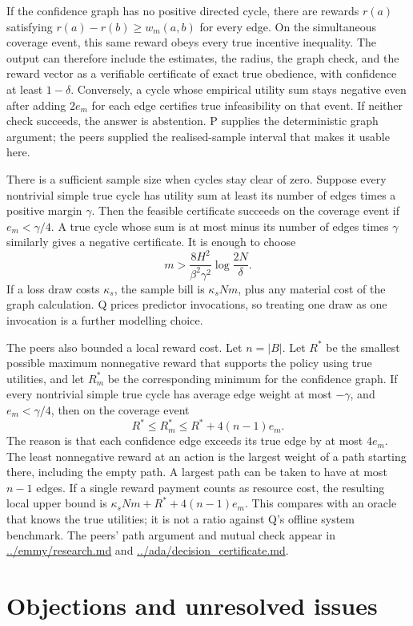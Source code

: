 \documentclass{article}
\begin{document}
If the confidence graph has no positive directed cycle, there are rewards \(r(a)\) satisfying
\(r(a)-r(b)\geq w_m(a,b)\) for every edge. On the simultaneous coverage event, this same reward
obeys every true incentive inequality. The output can therefore include the estimates, the radius,
the graph check, and the reward vector as a verifiable certificate of exact true obedience, with
confidence at least \(1-\delta\). Conversely, a cycle whose empirical utility sum stays negative
even after adding \(2e_m\) for each edge certifies true infeasibility on that event. If neither
check succeeds, the answer is abstention. P supplies the deterministic graph argument; the peers
supplied the realised-sample interval that makes it usable here.

There is a sufficient sample size when cycles stay clear of zero. Suppose every nontrivial simple
true cycle has utility sum at least its number of edges times a positive margin \(\gamma\). Then the
feasible certificate succeeds on the coverage event if \(e_m<\gamma/4\). A true cycle whose sum is
at most minus its number of edges times \(\gamma\) similarly gives a negative certificate. It is
enough to choose
\[
m>\frac{8H^2}{\beta^2\gamma^2}
\log\frac{2N}{\delta}.
\]
If a loss draw costs \(\kappa_s\), the sample bill is \(\kappa_sNm\), plus any material cost of the
graph calculation. Q prices predictor invocations, so treating one draw as one invocation is a
further modelling choice.

The peers also bounded a local reward cost. Let \(n=|B|\). Let \(R^*\) be the smallest possible
maximum nonnegative reward that supports the policy using true utilities, and let \(R_m^*\) be the
corresponding minimum for the confidence graph. If every nontrivial simple true cycle has average
edge weight at most \(-\gamma\), and \(e_m<\gamma/4\), then on the coverage event
\[
R^*\leq R_m^*\leq R^*+4(n-1)e_m.
\]
The reason is that each confidence edge exceeds its true edge by at most \(4e_m\). The least
nonnegative reward at an action is the largest weight of a path starting there, including the empty
path. A largest path can be taken to have at most \(n-1\) edges. If a single reward payment counts
as resource cost, the resulting local upper bound is \(\kappa_sNm+R^*+4(n-1)e_m\). This compares
with an oracle that knows the true utilities; it is not a ratio against Q's offline system
benchmark. The peers' path argument and mutual check appear in \url{../emmy/research.md} and
\url{../ada/decision_certificate.md}.

\section{Objections and unresolved issues}
\end{document}
